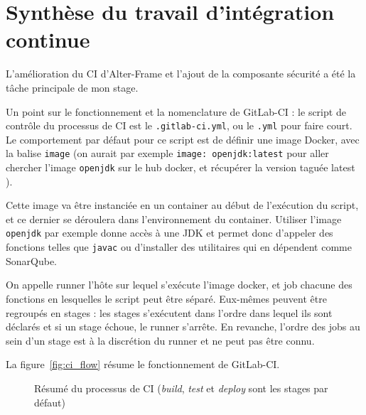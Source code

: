\section{Synthèse du travail d'intégration continue}
\label{sec:synthese_ci}
L'amélioration du CI d'Alter-Frame et l'ajout de la composante sécurité a été la tâche principale de mon stage.

Un point sur le fonctionnement et la nomenclature de GitLab-CI\cite{gitlab_ci_workflow} : le script de contrôle du processus de CI est le \texttt{.gitlab-ci.yml}, ou le \texttt{.yml} pour faire court. Le comportement par défaut pour ce script est de définir une image Docker, avec la balise \texttt{image} (on aurait par exemple \texttt{image: openjdk:latest} pour aller chercher l'image \verb|openjdk| sur le hub docker, et récupérer la version taguée \og latest \fg{}).

Cette image va être instanciée en un container au début de l'exécution du script, et ce dernier se déroulera dans l'environnement du container. Utiliser l'image \verb|openjdk| par exemple donne accès à une JDK et permet donc d'appeler des fonctions telles que \verb|javac| ou d'installer des utilitaires qui en dépendent comme SonarQube.

On appelle \og runner \fg{} l'hôte sur lequel s'exécute l'image docker, et \og job \fg{} chacune des fonctions en lesquelles le script peut être séparé. Eux-mêmes peuvent être regroupés en \fg stages \og{} : les stages s'exécutent dans l'ordre dans lequel ils sont déclarés et si un stage échoue, le runner s'arrête. En revanche, l'ordre des jobs au sein d'un stage est à la discrétion du runner et ne peut pas être connu.

La figure~\ref{fig:ci_flow} résume le fonctionnement de GitLab-CI.

\begin{figure}
	\centering
	\caption{Résumé du processus de CI (\emph{build}, \emph{test} et \emph{deploy} sont les stages par défaut)}
	\label{fig:ci_process}
\end{figure}

